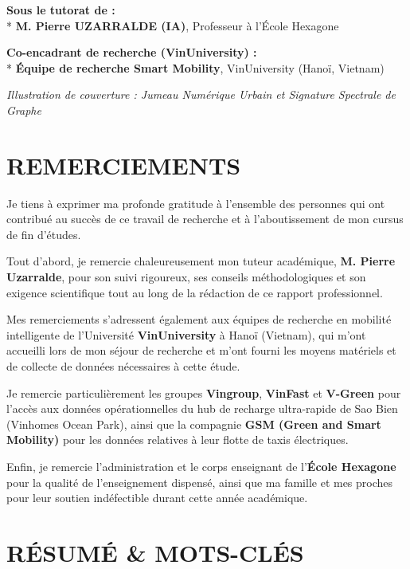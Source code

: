 \documentclass[11pt, a4paper]{article}
\begin{document}
\textbf{Sous le tutorat de :}\\
* \textbf{M. Pierre UZARRALDE (IA)}, Professeur à l'École Hexagone

\textbf{Co-encadrant de recherche (VinUniversity) :}\\
* \textbf{Équipe de recherche Smart Mobility}, VinUniversity (Hanoï,
Vietnam)

\emph{Illustration de couverture : Jumeau Numérique Urbain et Signature
Spectrale de Graphe}

\newpage

\section{REMERCIEMENTS}\label{remerciements}

Je tiens à exprimer ma profonde gratitude à l'ensemble des personnes qui
ont contribué au succès de ce travail de recherche et à l'aboutissement
de mon cursus de fin d'études.

Tout d'abord, je remercie chaleureusement mon tuteur académique,
\textbf{M. Pierre Uzarralde}, pour son suivi rigoureux, ses conseils
méthodologiques et son exigence scientifique tout au long de la
rédaction de ce rapport professionnel.

Mes remerciements s'adressent également aux équipes de recherche en
mobilité intelligente de l'Université \textbf{VinUniversity} à Hanoï
(Vietnam), qui m'ont accueilli lors de mon séjour de recherche et m'ont
fourni les moyens matériels et de collecte de données nécessaires à
cette étude.

Je remercie particulièrement les groupes \textbf{Vingroup},
\textbf{VinFast} et \textbf{V-Green} pour l'accès aux données
opérationnelles du hub de recharge ultra-rapide de Sao Bien (Vinhomes
Ocean Park), ainsi que la compagnie \textbf{GSM (Green and Smart
Mobility)} pour les données relatives à leur flotte de taxis
électriques.

Enfin, je remercie l'administration et le corps enseignant de
l'\textbf{École Hexagone} pour la qualité de l'enseignement dispensé,
ainsi que ma famille et mes proches pour leur soutien indéfectible
durant cette année académique.

\newpage

\section{RÉSUMÉ \& MOTS-CLÉS}\label{ruxe9sumuxe9-mots-cluxe9s}
\end{document}
